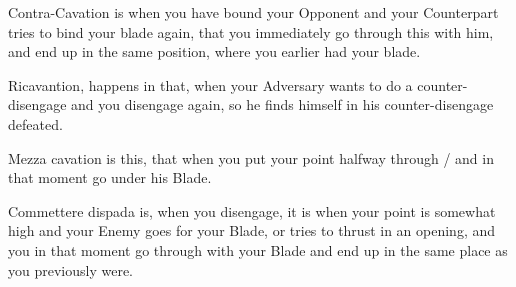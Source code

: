 \newpage


\newpage



Contra-Cavation is when you have bound your Opponent and your
Counterpart tries to bind your blade again, that you immediately go
through this with him, and end up in the same position, where you
earlier had your blade.


Ricavantion, happens in that, when your Adversary wants to do a
counter-disengage and you disengage
again, so he finds himself in his counter-disengage defeated.


Mezza cavation is this, that when you put your point halfway through /
and in that moment go under his Blade.


Commettere dispada is, when you disengage, it is when your point is
somewhat high and your Enemy goes for your Blade, or tries to thrust
in an opening, and you in that moment go through with your Blade and
end up in the same place as you previously were.


